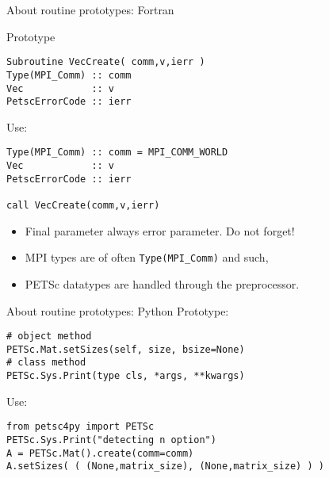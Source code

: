 \lstset{language=Fortran}
\begin{frame}[containsverbatim]{About routine prototypes: Fortran}
\begin{multicols}{2}
\footnotesize
Prototype
\begin{lstlisting}
Subroutine VecCreate( comm,v,ierr )
Type(MPI_Comm) :: comm
Vec            :: v
PetscErrorCode :: ierr
\end{lstlisting}
Use:
\begin{lstlisting}
Type(MPI_Comm) :: comm = MPI_COMM_WORLD
Vec            :: v
PetscErrorCode :: ierr

call VecCreate(comm,v,ierr)
\end{lstlisting}
\columnbreak
\begin{itemize}
\item Final parameter always error parameter. Do not forget!
\item MPI types are of often \lstinline{Type(MPI_Comm)} and such,
\item PETSc datatypes are handled through the preprocessor.
\end{itemize}
\hbox{}\vfill\hbox{}
\end{multicols}
\end{frame}

\lstset{language=Python}
\begin{frame}[containsverbatim]{About routine prototypes: Python}
Prototype:
\begin{lstlisting}
# object method
PETSc.Mat.setSizes(self, size, bsize=None)
# class method
PETSc.Sys.Print(type cls, *args, **kwargs)
\end{lstlisting}
Use:
\begin{lstlisting}
from petsc4py import PETSc
PETSc.Sys.Print("detecting n option")
A = PETSc.Mat().create(comm=comm)
A.setSizes( ( (None,matrix_size), (None,matrix_size) ) )
\end{lstlisting}
\end{frame}

